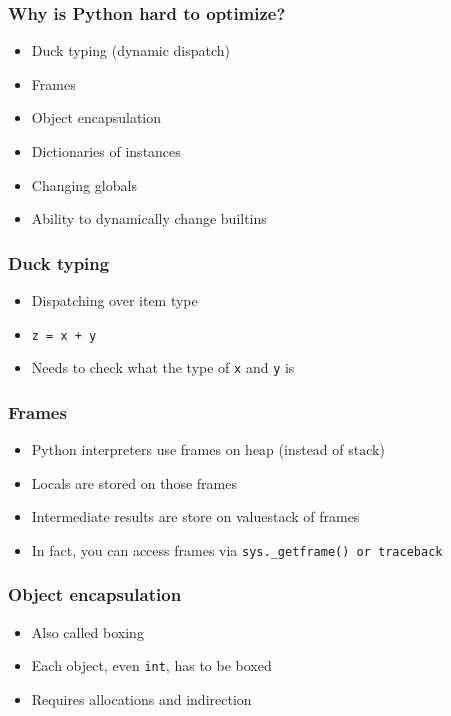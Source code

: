 \documentclass[utf8x]{beamer}
\begin{document}
\begin{frame}
  \frametitle{Why is Python hard to optimize?}
  \begin{itemize}
    \item Duck typing (dynamic dispatch)
    \item Frames
    \item Object encapsulation
    \item Dictionaries of instances
    \item Changing globals
    \item Ability to dynamically change builtins
  \end{itemize}
\end{frame}

\begin{frame}
  \frametitle{Duck typing}
  \begin{itemize}
    \item Dispatching over item type
    \item {\tt z = x + y}
    \item Needs to check what the type of {\tt x} and {\tt y} is
  \end{itemize}
\end{frame}

\begin{frame}
  \frametitle{Frames}
  \begin{itemize}
    \item Python interpreters use frames on heap (instead of stack)
    \item Locals are stored on those frames
    \item Intermediate results are store on valuestack of frames
    \item In fact, you can access frames via {\tt sys.\_getframe() or
      traceback}
  \end{itemize}
\end{frame}

\begin{frame}
  \frametitle{Object encapsulation}
  \begin{itemize}
    \item Also called boxing
    \item Each object, even {\tt int}, has to be boxed
    \item Requires allocations and indirection
  \end{itemize}
\end{frame}
\end{document}

